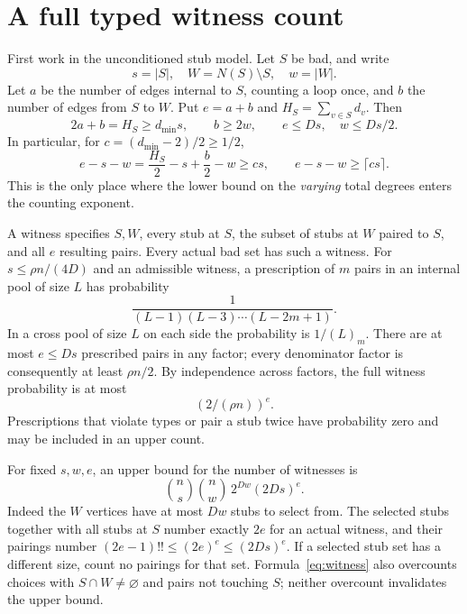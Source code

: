\documentclass[11pt]{article}
\begin{document}
\section{A full typed witness count}
First work in the unconditioned stub model. Let $S$ be bad, and write
\[
 s=|S|,\quad W=N(S)\setminus S,\quad w=|W|.
\]
Let $a$ be the number of edges internal to $S$, counting a loop once,
and $b$ the number of edges from $S$ to $W$. Put $e=a+b$ and
$H_S=\sum_{v\in S}d_v$. Then
\[
 2a+b=H_S\ge d_{\min}s,\qquad b\ge2w,
 \qquad e\le Ds,\quad w\le Ds/2.
\]
In particular, for $c=(d_{\min}-2)/2\ge1/2$,
\begin{equation}\label{eq:excess}
 e-s-w=\frac{H_S}2-s+\frac b2-w\ge cs,
 \qquad e-s-w\ge\lceil cs\rceil.
\end{equation}
This is the only place where the lower bound on the \emph{varying}
total degrees enters the counting exponent.

A witness specifies $S,W$, every stub at $S$, the subset of stubs at
$W$ paired to $S$, and all $e$ resulting pairs. Every actual bad set
has such a witness. For $s\le\rho n/(4D)$ and an admissible witness,
a prescription of $m$ pairs in an internal pool of size $L$ has
probability
\[
 \frac1{(L-1)(L-3)\cdots(L-2m+1)}.
\]
In a cross pool of size $L$ on each side the probability is
$1/(L)_m$. There are at most $e\le Ds$ prescribed pairs in any
factor; every denominator factor is consequently at least $\rho n/2$.
By independence across factors, the full witness probability is at most
\begin{equation}\label{eq:prob}
 (2/(\rho n))^e.
\end{equation}
Prescriptions that violate types or pair a stub twice have probability
zero and may be included in an upper count.

For fixed $s,w,e$, an upper bound for the number of witnesses is
\begin{equation}\label{eq:witness}
 \binom ns\binom nw\,2^{Dw}(2Ds)^e.
\end{equation}
Indeed the $W$ vertices have at most $Dw$ stubs to select from. The
selected stubs together with all stubs at $S$ number exactly $2e$ for
an actual witness, and their pairings number $(2e-1)!!\le(2e)^e
\le(2Ds)^e$. If a selected stub set has a different size, count no
pairings for that set. Formula~\eqref{eq:witness} also overcounts
choices with $S\cap W\ne\varnothing$ and pairs not touching $S$;
neither overcount invalidates the upper bound.
\end{document}
